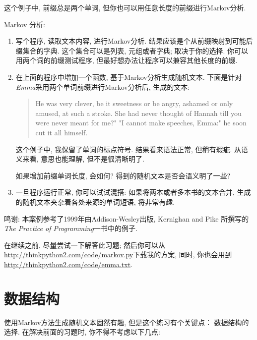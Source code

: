 \documentclass[10pt]{book}
\begin{document}
这个例子中, 前缀总是两个单词, 但你也可以用任意长度的前缀进行Markov分析. 

\begin{exercise}

Markov 分析:

\begin{enumerate}

\item 写个程序, 读取文本内容, 进行Markov分析. 
结果应该是个从前缀映射到可能后缀集合的字典. 
这个集合可以是列表, 元组或者字典; 取决于你的选择. 
你可以用两个词的前缀测试程序, 但最好想办法让程序可以兼容其他长度的前缀. 

\item 在上面的程序中增加一个函数, 基于Markov分析生成随机文本. 
下面是针对 {\em Emma}采用两个单词前缀进行Markov分析后, 生成的文本:

\begin{quote}
He was very clever, be it sweetness or be angry, ashamed or only
amused, at such a stroke. She had never thought of Hannah till you
were never meant for me?" "I cannot make speeches, Emma:" he soon cut
it all himself.
\end{quote}

这个例子中, 我保留了单词的标点符号. 
结果看来语法正常, 但稍有瑕疵. 
从语义来看, 意思也能理解, 但不是很清晰明了. 

如果增加前缀单词长度, 会如何? 得到的随机文本是否会语义明了一些?

\item 一旦程序运行正常, 你可以试试混搭: 
如果将两本或者多本书的文本合并, 生成的随机文本夹杂着各处来源的单词短语, 将非常有趣. 

\end{enumerate}

鸣谢: 本案例参考了1999年由Addison-Wesley出版, Kernighan and Pike
所撰写的{\em The Practice of Programming}一书中的例子. 
\end{exercise}

在继续之前, 尽量尝试一下解答此习题; 然后你可以从 
\url{http://thinkpython2.com/code/markov.py}下载我的方案, 同时, 
你也会用到\url{http://thinkpython2.com/code/emma.txt}.


\section{数据结构}

使用Markov方法生成随机文本固然有趣, 但是这个练习有个关键点：
数据结构的选择. 在解决前面的习题时, 你不得不考虑以下几点:
\end{document}
